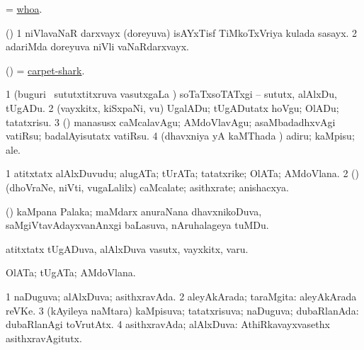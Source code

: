 \bentry
{} 
\gl{\BAavayx}
\expl{}
\bmng
= \hyperlink{whoa}{whoa}. 
\emng
\eentry

\bentry
{} 
\gl{\saMkiSx}
\expl{}
\bmng
{} 
\emng
\eentry

\bentry
{} 
\gl{\nA}
\expl{}
\bmng
(\ca) 
\bnum
\num{1} niVlavaNaR darxvayx (doreyuva) isAYxTisf TiMkoTxVriya kulada sasayx. 
\num{2} adariMda doreyuva niVli vaNaRdarxvayx. 
\enum
\emng
\eentry

\bentry
{} 
\gl{\nA}
\expl{}
\bmng
(\AseTxrXV) = \hyperref{kandict_c.pdf}{C}{carpet-shark}{carpet-shark}. 
\emng
\eentry

\bentry
{} 
\gl{\akirx}
\expl{}
\bmng
\bnum
\num{1} (buguri \mo\ sututxtitxruva vasutxgaLa \vi) soTaTxsoTATxgi -- sututx, alAlxDu, tUgADu. 
\num{2} (vayxkitx, kiSxpaNi, \mo vu) UgalADu; tUgADutatx hoVgu; OlADu; tatatxrisu. 
\num{3} (\rUpa) manasusx caMcalavAgu; AMdoVlavAgu; asaMbadadhxvAgi vatiRsu; badalAyisutatx vatiRsu. 
\num{4} (dhavxniya yA kaMThada \vi) adiru; kaMpisu; ale. 
\enum
\emng
\eentry

\bentry
{} 
\gl{\nA}
\expl{}
\bmng
\bnum
\num{1} atitxtatx alAlxDuvudu; alugATa; tUrATa; tatatxrike; OlATa; AMdoVlana. 
\num{2} (\rUpa) (dhoVraNe, niVti, \mo vugaLalilx) caMcalate; asithxrate; anishacxya. 
\enum
\emng
\eentry

\bentry
{} 
\gl{\nA}
\expl{}
\bmng
(\AseTxrXV) kaMpana Palaka; maMdarx anuraNana dhavxnikoDuva, saMgiVtavAdayxvanAnxgi baLasuva, nAruhalageya tuMDu. 
\emng
\eentry

\bentry
{} 
\gl{\nA}
\expl{}
\bmng
atitxtatx tUgADuva, alAlxDuva vasutx, vayxkitx, \mo varu. 
\emng
\eentry

\bentry
{} 
\gl{\nA}
\expl{}
\bmng
OlATa; tUgATa; AMdoVlana. 
\emng
\eentry

\bentry
{} 
\gl{\gu}
\bmng
\bnum
\num{1} naDuguva; alAlxDuva; asithxravAda. 
\num{2} aleyAkArada; taraMgita:  aleyAkArada reVKe. 
\num{3} (kAyileya naMtara) kaMpisuva; tatatxrisuva; naDuguva; dubaRlanAda:  dubaRlanAgi toVrutAtx. 
\num{4} asithxravAda; alAlxDuva:  AthiRkavayxvasethx asithxravAgitutx. 
\enum
\emng

